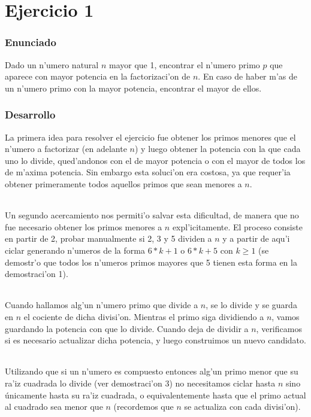 \part{Ejercicio 1}
\section{Enunciado}
Dado un n'umero natural $n$ mayor que 1, encontrar el n'umero primo $p$ que aparece con mayor potencia en la factorizaci'on 
de $n$. En caso de haber m'as de un n'umero primo con  la mayor potencia, encontrar el mayor de ellos.

\section{Desarrollo}
La primera idea para resolver el ejercicio fue obtener los primos menores que el n'umero a factorizar
(en adelante $n$) y luego obtener la potencia con la que cada uno lo divide, qued'andonos con el de mayor
potencia o con el mayor de todos los de m'axima potencia. Sin embargo esta soluci'on era costosa, ya que
requer'ia obtener primeramente todos aquellos primos que sean menores a $n$.
\paragraph{}
Un segundo acercamiento nos permiti'o salvar esta dificultad, de manera que no fue necesario obtener 
los primos menores a $n$ expl'icitamente. El proceso consiste en partir de 2, probar manualmente si 2, 3 y 5 
dividen a $n$ y a partir  de aqu'i ciclar generando n'umeros de la forma $6*k + 1$ o $6*k + 5$ con $k \geq 1$ 
(se demostr'o que todos los n'umeros primos mayores que 5 tienen esta forma en la demostraci'on 1).
\paragraph{}
Cuando hallamos alg'un n'umero primo que divide a $n$, se lo divide y se guarda en $n$ el cociente de dicha 
divisi'on. Mientras el primo siga dividiendo a $n$, vamos guardando la potencia con que lo divide. 
Cuando deja de dividir a $n$, verificamos si es necesario actualizar dicha potencia, y luego construimos 
un nuevo candidato. 
\paragraph{}
Utilizando que si un n'umero es compuesto entonces alg'un primo menor que su ra'iz cuadrada lo divide 
(ver demostraci'on 3) no necesitamos ciclar hasta $n$ sino únicamente hasta su ra'iz cuadrada, o equivalentemente
hasta que el primo actual al cuadrado sea menor que $n$ (recordemos que $n$ se actualiza con cada divisi'on).
